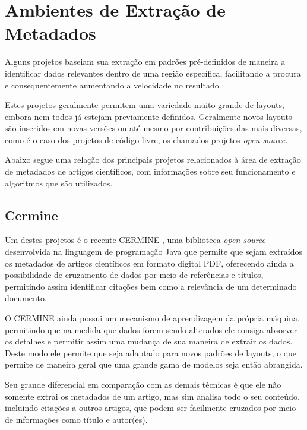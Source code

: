 
\section{Ambientes de Extração de Metadados}
\label{sec:environments}

Alguns projetos baseiam sua extração em padrões pré-definidos de maneira a identificar dados relevantes dentro de uma região específica, facilitando a procura e consequentemente aumentando a velocidade no resultado. 

Estes projetos geralmente permitem uma variedade muito grande de layouts, embora nem todos já estejam previamente definidos. Geralmente novos layouts são inseridos em novas versões ou até mesmo por contribuições das mais diversas, como é o caso dos projetos de código livre, os chamados projetos \textit{open source}.

Abaixo segue uma relação dos principais projetos relacionados à área de extração de metadados de artigos científicos, com informações sobre seu funcionamento e algoritmos que são utilizados.

\subsection{Cermine}
\label{ssec:cermine}


Um destes projetos é o recente CERMINE \cite{cermine}, uma biblioteca \textit{open source} desenvolvida na linguagem de programação Java que permite que sejam extraídos os metadados de artigos científicos em formato digital PDF, oferecendo ainda a possibilidade de cruzamento de dados por meio de referências e títulos, permitindo assim identificar citações bem como a relevância de um determinado documento.

O CERMINE ainda possui um mecanismo de aprendizagem da própria máquina, permitindo que na medida que dados forem sendo alterados ele consiga absorver os detalhes e permitir assim uma mudança de sua maneira de extrair os dados. Deste modo ele permite que seja adaptado para novos padrões de layouts, o que permite de maneira geral que uma grande gama de modelos seja então abrangida. 

Seu grande diferencial em comparação com as demais técnicas é que ele não somente extrai os metadados de um artigo, mas sim analisa todo o seu conteúdo, incluindo citações a outros artigos, que podem ser facilmente cruzados por meio de informações como título e autor(es).

